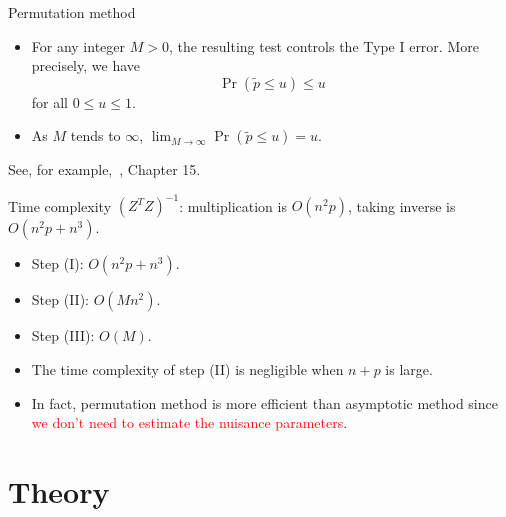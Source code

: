 \documentclass{beamer}
\theoremstyle{plain}
\theoremstyle{definition}
\theoremstyle{remark}
\begin{document}
\begin{frame}{Permutation method}
    \begin{itemize}
        \item
            For any integer $M>0$, the resulting test controls the Type I error. More precisely, we have 
            $$\Pr(\tilde{p}\leq u)\leq u$$
            for all $0\leq u \leq 1$.
        \item
            As $M$ tends to $\infty$, $\lim_{M\to\infty}\Pr(\tilde{p}\leq u)=u$.
    \end{itemize}
    See, for example,~\cite{Lehmann}, Chapter 15.
\end{frame}
\begin{frame}{Time complexity}
                    $(Z^T Z)^{-1}$: multiplication is $O(n^2 p)$, taking inverse is $O(n^2 p+n^3)$.
    \begin{itemize}
        \item
            Step (I): $O(n^2 p+n^3)$.
        \item
            Step (II): $O(Mn^2)$.
        \item
            Step (III): $O(M)$.
    \end{itemize}
            
            \begin{itemize}
        \item
            The time complexity of step (II) is negligible when $n+p$ is large.
        \item
            In fact, permutation method is more efficient than asymptotic method
                    since  \textcolor{red}{we don't need to estimate the nuisance parameters}.
            \end{itemize}
\end{frame}
\section{Theory}
\end{document}
